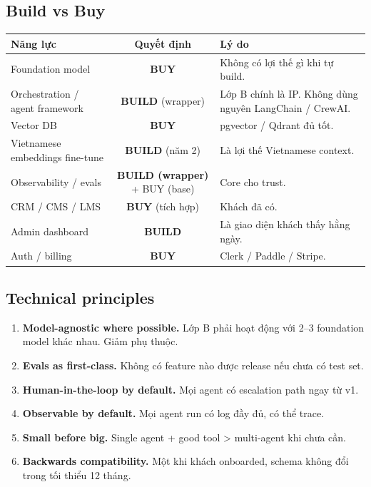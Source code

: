 \documentclass[11pt,a4paper]{article}
\begin{document}
\subsection{Build vs Buy}

\begin{tabularx}{\linewidth}{@{}p{4cm} c X@{}}
\toprule
\textbf{Năng lực} & \textbf{Quyết định} & \textbf{Lý do} \\
\midrule
Foundation model & \textcolor{warn}{\textbf{BUY}} & Không có lợi thế gì khi tự build. \\
Orchestration / agent framework & \textbf{BUILD} (wrapper) & Lớp B chính là IP. Không dùng nguyên LangChain / CrewAI. \\
Vector DB & \textcolor{warn}{\textbf{BUY}} & pgvector / Qdrant đủ tốt. \\
Vietnamese embeddings fine-tune & \textbf{BUILD} (năm 2) & Là lợi thế Vietnamese context. \\
Observability / evals & \textbf{BUILD (wrapper)} + BUY (base) & Core cho trust. \\
CRM / CMS / LMS & \textcolor{warn}{\textbf{BUY}} (tích hợp) & Khách đã có. \\
Admin dashboard & \textbf{BUILD} & Là giao diện khách thấy hằng ngày. \\
Auth / billing & \textcolor{warn}{\textbf{BUY}} & Clerk / Paddle / Stripe. \\
\bottomrule
\end{tabularx}

\subsection{Technical principles}

\begin{enumerate}
\item \textbf{Model-agnostic where possible.} Lớp B phải hoạt động với 2--3 foundation model khác nhau. Giảm phụ thuộc.
\item \textbf{Evals as first-class.} Không có feature nào được release nếu chưa có test set.
\item \textbf{Human-in-the-loop by default.} Mọi agent có escalation path ngay từ v1.
\item \textbf{Observable by default.} Mọi agent run có log đầy đủ, có thể trace.
\item \textbf{Small before big.} Single agent + good tool > multi-agent khi chưa cần.
\item \textbf{Backwards compatibility.} Một khi khách onboarded, schema không đổi trong tối thiểu 12 tháng.
\end{enumerate}
\end{document}
